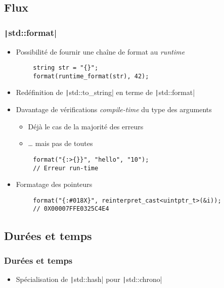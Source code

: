 \documentclass[C++.tex]{subfiles}
\begin{document}
\subsection*{Flux}
\begin{frame}[fragile]
	\frametitle{\texttt|std::format|}
	\begin{itemize}
		\item Possibilité de fournir une chaîne de format au \textit{runtime}
	\end{itemize}

	\begin{verbatim}
		string str = "{}";
		format(runtime_format(str), 42);
	\end{verbatim}

	\begin{itemize}
		\item Redéfinition de \texttt|std::to_string| en terme de \texttt|std::format|
		\item Davantage de vérifications \textit{compile-time} du type des arguments
		\begin{itemize}
			\item Déjà le cas de la majorité des erreurs
			\item \ldots{} mais pas de toutes
		\end{itemize}
	\end{itemize}

	\begin{verbatim}
		format("{:>{}}", "hello", "10");
		// Erreur run-time
	\end{verbatim}

	\begin{itemize}
		\item Formatage des pointeurs
	\end{itemize}

	\begin{verbatim}
		format("{:#018X}", reinterpret_cast<uintptr_t>(&i));
		// 0X00007FFE0325C4E4
	\end{verbatim}
\end{frame}

\subsection*{Durées et temps}
\begin{frame}[fragile]
	\frametitle{Durées et temps}
	\begin{itemize}
		\item Spécialisation de \texttt|std::hash| pour \texttt|std::chrono|
	\end{itemize}
\end{frame}
\end{document}
